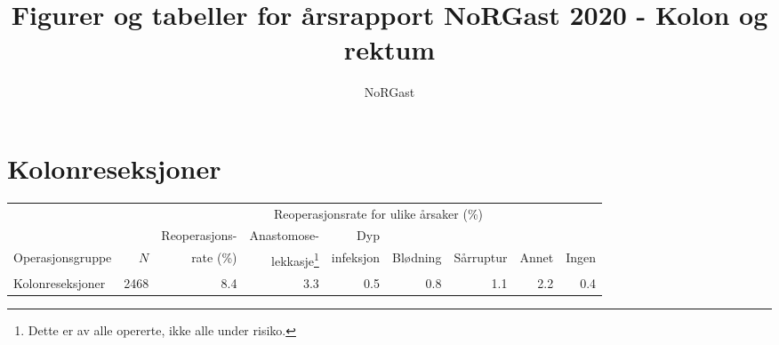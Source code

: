 \documentclass[norsk,a4paper]{article}\usepackage[]{graphicx}\usepackage[]{color}
\title{Figurer og tabeller for årsrapport NoRGast 2020 - Kolon og rektum}
\author{NoRGast}
\begin{document}
\maketitle


\clearpage



\section{Kolonreseksjoner}

\begin{table}[htb]
\begin{minipage}{\textwidth}
\centering
\begin{tabular}{lrrrrrrrr}
  \toprule
  & & & \multicolumn{4}{c}{Reoperasjonsrate for ulike årsaker (\%)} \\
 \cline{4-9} 
 & & Reoperasjons- & Anastomose- & Dyp &&&&  \\
 Operasjonsgruppe & $N$ & rate (\%) & lekkasje\footnote[2]{Dette er av alle opererte, ikke
alle under risiko.} & infeksjon & Blødning & Sårruptur & Annet & Ingen \\
 \midrule
Kolonreseksjoner & 2468 & 8.4 & 3.3 & 0.5 & 0.8 & 1.1 & 2.2 & 0.4 \\ 
   \bottomrule
\end{tabular}

\end{minipage}
\end{table}

\end{document}
